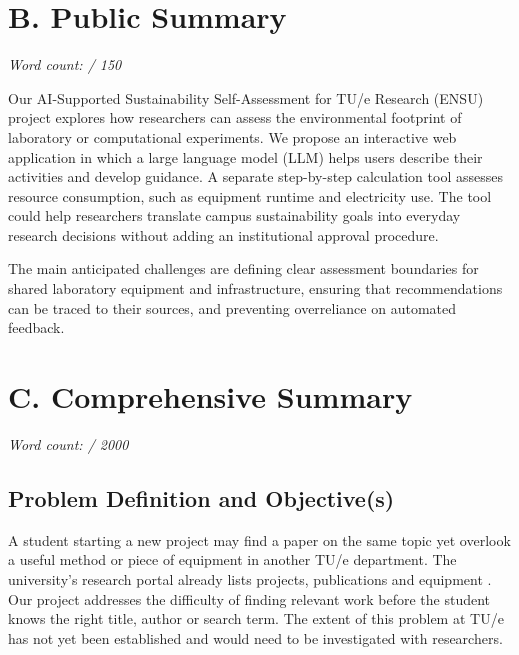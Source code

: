 \documentclass[11pt,a4paper]{article}
\begin{document}
\section*{B. Public Summary}
\noindent\textit{Word count: \Bwordcount / 150}\par\medskip


\vspace{1em}
\noindent Our AI-Supported Sustainability Self-Assessment for TU/e Research (ENSU) project explores how researchers can assess the environmental footprint of laboratory or computational experiments. We propose an interactive web application in which a large language model (LLM) helps users describe their activities and develop guidance. A separate step-by-step calculation tool assesses resource consumption, such as equipment runtime and electricity use. The tool could help researchers translate campus sustainability goals into everyday research decisions without adding an institutional approval procedure.

The main anticipated challenges are defining clear assessment boundaries for shared laboratory equipment and infrastructure, ensuring that recommendations can be traced to their sources, and preventing overreliance on automated feedback.
\clearpage

\section*{C. Comprehensive Summary}
\noindent\textit{Word count: \Cwordcount / 2000}\par\medskip

\subsection*{Problem Definition and Objective(s)}

A student starting a new project may find a paper on the same topic yet overlook a useful method or piece of equipment in another TU/e department. The university's research portal already lists projects, publications and equipment \citep{tueportal}. Our project addresses the difficulty of finding relevant work before the student knows the right title, author or search term. The extent of this problem at TU/e has not yet been established and would need to be investigated with researchers.
\end{document}
